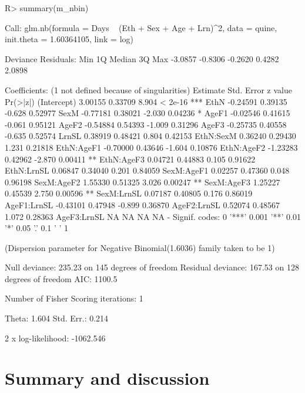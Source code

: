 \documentclass[article, shortnames]{jss}
\begin{document}
\begin{CodeChunk}
\begin{CodeInput}
R> summary(m\_nbin)
\end{CodeInput}
\begin{CodeOutput}
Call:
glm.nb(formula = Days ~ (Eth + Sex + Age + Lrn)^2, data = quine, 
    init.theta = 1.60364105, link = log)

Deviance Residuals: 
    Min       1Q   Median       3Q      Max  
-3.0857  -0.8306  -0.2620   0.4282   2.0898  

Coefficients: (1 not defined because of singularities)
            Estimate Std. Error z value Pr(>|z|)    
(Intercept)  3.00155    0.33709   8.904  < 2e-16 ***
EthN        -0.24591    0.39135  -0.628  0.52977    
SexM        -0.77181    0.38021  -2.030  0.04236 *  
AgeF1       -0.02546    0.41615  -0.061  0.95121    
AgeF2       -0.54884    0.54393  -1.009  0.31296    
AgeF3       -0.25735    0.40558  -0.635  0.52574    
LrnSL        0.38919    0.48421   0.804  0.42153    
EthN:SexM    0.36240    0.29430   1.231  0.21818    
EthN:AgeF1  -0.70000    0.43646  -1.604  0.10876    
EthN:AgeF2  -1.23283    0.42962  -2.870  0.00411 ** 
EthN:AgeF3   0.04721    0.44883   0.105  0.91622    
EthN:LrnSL   0.06847    0.34040   0.201  0.84059    
SexM:AgeF1   0.02257    0.47360   0.048  0.96198    
SexM:AgeF2   1.55330    0.51325   3.026  0.00247 ** 
SexM:AgeF3   1.25227    0.45539   2.750  0.00596 ** 
SexM:LrnSL   0.07187    0.40805   0.176  0.86019    
AgeF1:LrnSL -0.43101    0.47948  -0.899  0.36870    
AgeF2:LrnSL  0.52074    0.48567   1.072  0.28363    
AgeF3:LrnSL       NA         NA      NA       NA    
-
Signif. codes:  0 '***' 0.001 '**' 0.01 '*' 0.05 '.' 0.1 ' ' 1

(Dispersion parameter for Negative Binomial(1.6036) family taken to be 1)

    Null deviance: 235.23  on 145  degrees of freedom
Residual deviance: 167.53  on 128  degrees of freedom
AIC: 1100.5

Number of Fisher Scoring iterations: 1


              Theta:  1.604 
          Std. Err.:  0.214 

 2 x log-likelihood:  -1062.546 
\end{CodeOutput}
\end{CodeChunk}
\fi



\FloatBarrier

\section{Summary and discussion} \label{sec:summary}
\end{document}
